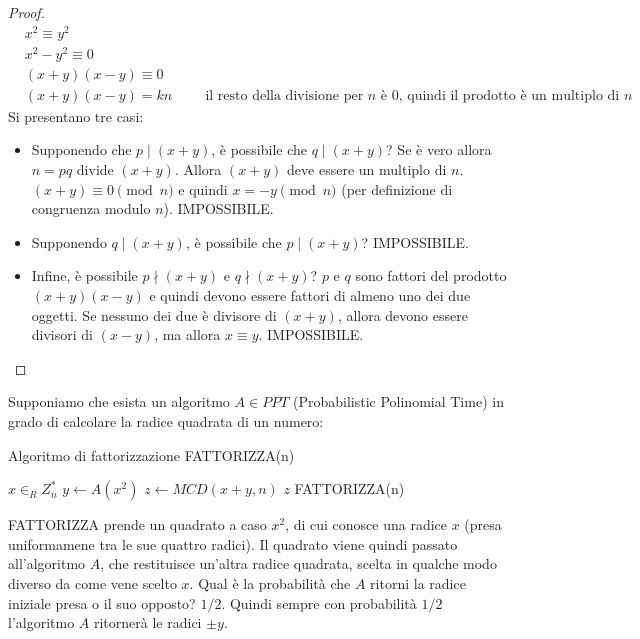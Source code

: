 \begin{proof}
\begin{align*}
    &x^2 \equiv y^2\\
    &x^2 - y^2 \equiv 0\\
    &(x+y)(x-y) \equiv 0\\
    &(x+y)(x-y) = kn \hspace{1cm} \text{il resto della divisione per $n$ è 0, quindi il prodotto è un multiplo di $n$}
\end{align*}
\noindent Si presentano tre casi:
\begin{itemize}
    \item Supponendo che $p \mid(x+y)$, è possibile che $q \mid(x+y)$? Se è vero allora $n = pq$ divide $(x+y)$. Allora $(x+y)$ deve essere un multiplo di $n$. $(x+y) \equiv 0 \pmod n$ e quindi $x = -y \pmod n$ (per definizione di congruenza modulo $n$). IMPOSSIBILE.

   \item Supponendo $q \mid(x+y)$, è possibile che $p \mid(x+y)$? IMPOSSIBILE.

   \item  Infine, è possibile $p \nmid(x+y)$ e $q \nmid(x+y)$? $p$ e $q$ sono fattori del prodotto $(x+y)(x-y)$ e quindi devono essere fattori di almeno uno dei due oggetti. Se nessuno dei due è divisore di $(x+y)$, allora devono essere divisori di $(x-y)$, ma allora $x \equiv y$. IMPOSSIBILE.
\end{itemize}
\end{proof}

\noindent Supponiamo che esista un algoritmo $A \in PPT$ (Probabilistic Polinomial Time) in grado di calcolare la radice quadrata di un numero:

\begin{algorithm}[H]
\caption{Algoritmo di fattorizzazione FATTORIZZA(n)}\label{alg:cap}
\begin{algorithmic}
\State $x \in_R Z_n^*$
\State $y \gets A(x^2)$
\State $z \gets MCD(x+y, n)$
    \State \Return $z$
\Else
    \State \Return FATTORIZZA(n)
\EndIf
\end{algorithmic}
\end{algorithm}

\noindent FATTORIZZA prende un quadrato a caso $x^2$, di cui conosce una radice $x$ (presa uniformamene tra le sue quattro radici). Il quadrato viene quindi passato all'algoritmo $A$, che restituisce un'altra radice quadrata, scelta in qualche modo diverso da come vene scelto $x$. Qual è la probabilità che $A$ ritorni la radice iniziale presa o il suo opposto? $1 / 2$. Quindi sempre con probabilità $1 / 2$ l'algoritmo $A$ ritornerà le radici $\pm y$. 

